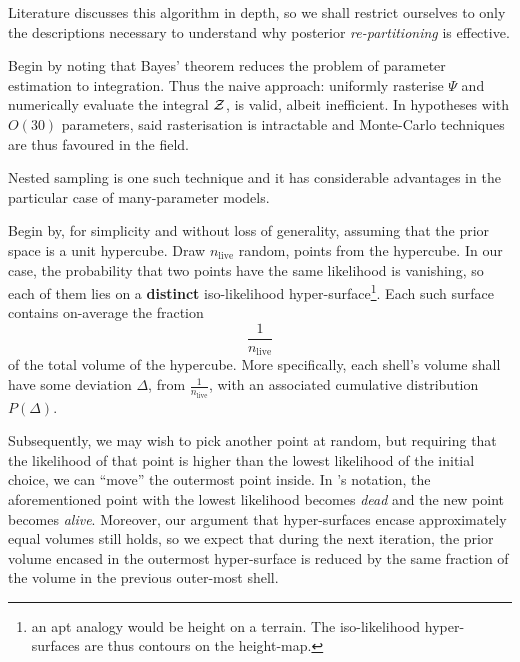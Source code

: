 \documentclass[usenatbib]{mnras}
\begin{document}
Literature \citep{taboga2017lectures} discusses this algorithm in
depth, so we shall restrict ourselves to only the descriptions
necessary to understand why posterior \emph{re-partitioning} is
effective.

Begin by noting that Bayes' theorem reduces the problem of
parameter estimation to integration. Thus the naive approach:
uniformly rasterise \(\Psi\) and numerically evaluate the integral
\({\cal Z}\), is valid, albeit inefficient. In hypotheses with
\(O(30)\) parameters, said rasterisation is intractable
\citep{Caflisch_1998} and Monte-Carlo techniques are thus favoured in
the field.

Nested sampling is one such technique and it has considerable
advantages in the particular case of many-parameter models.

Begin by, for simplicity and without loss of generality, assuming
that the prior space is a unit hypercube. Draw \(n_\text{live}\)
random, points from the hypercube. In our case, the probability
that two points have the same likelihood is vanishing, so each of
them lies on a \textbf{distinct} iso-likelihood hyper-surface\footnote{an apt
analogy would be height on a terrain. The iso-likelihood
hyper-surfaces are thus contours on the height-map.}. Each such
surface contains on-average the fraction
\begin{equation}
\frac{1}{n_\text{live}}
\end{equation}
of the total volume of the hypercube. More specifically, each
shell's volume shall have some deviation \(\Delta\), from
\(\frac{1}{n_\text{live}}\), with an associated cumulative
distribution \(P(\Delta)\).

Subsequently, we may wish to pick another point at random, but
requiring that the likelihood of that point is higher than the
lowest likelihood of the initial choice, we can ``move'' the
outermost point inside. In \citeauthor{Skilling2006} 's notation, the
aforementioned point with the lowest likelihood becomes \emph{dead} and
the new point becomes \emph{alive}. Moreover, our argument that
hyper-surfaces encase approximately equal volumes still holds, so
we expect that during the next iteration, the prior volume encased
in the outermost hyper-surface is reduced by the same fraction of
the volume in the previous outer-most shell.
\end{document}
